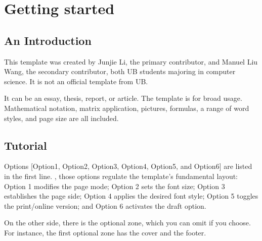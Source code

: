 \documentclass[a4paper, 12pt, oneside, times, print, NoDraft]{template/UBtemplate}
\begin{document}




\frontmatter %







\mainmatter %










\chapter{Getting started}

\section{An Introduction}
This template was created by Junjie Li, the primary contributor, and Manuel Liu Wang, the secondary contributor, both UB students majoring in computer science. It is not an official template from UB.

It can be an essay, thesis, report, or article. The template is for broad usage. Mathematical notation, matrix application, pictures, formulas, a range of word styles, and page size are all included.


\section{Tutorial}
Options [Option1, Option2, Option3, Option4, Option5, and Option6] are listed in the first line. , those options regulate the template's fundamental layout: Option 1 modifies the page mode; Option 2 sets the font size; Option 3 establishes the page side; Option 4 applies the desired font style; Option 5 toggles the print/online version; and Option 6 activates the draft option.

On the other side, there is the optional zone, which you can omit if you choose. For instance, the first optional zone has the cover and the footer.
\end{document}
